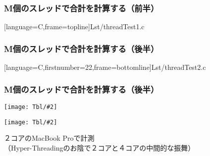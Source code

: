 \documentclass[dvipdfmx]{beamer}
\newcommand{\tbl}[2]{\begin{center}\texttt{[image: Tbl/\#2]}\end{center}}
\begin{document}
\begin{frame}[fragile]
  \frametitle{M個のスレッドで合計を計算する（前半）}
  
      [language={C},frame=topline]{Lst/threadTest1.c}
\end{frame}

\begin{frame}[fragile]
  \frametitle{M個のスレッドで合計を計算する（後半）}
  
      [language={C},firstnumber=22,frame=bottomline]{Lst/threadTest2.c}
\end{frame}

\begin{frame}[fragile]
  \frametitle{M個のスレッドで合計を計算する（後半）}
  \tbl{scale=0.9}{threadTimeTbl.pdf}
  \tbl{scale=0.8}{threadTimeGrph.pdf}
  ２コアのMacBook Proで計測\\
  （Hyper-Threadingのお陰で２コアと４コアの中間的な振舞）
\end{frame}
\end{document}
